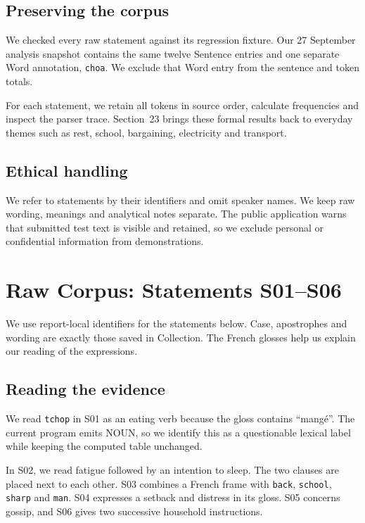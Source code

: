 \documentclass[11pt]{article}
\newcommand{\code}[1]{\texttt{#1}}
\begin{document}
\subsection*{Preserving the corpus}
We checked every raw statement against its regression fixture. Our
27 September analysis snapshot contains the same twelve Sentence entries
and one separate Word annotation, \code{choa}. We exclude that Word entry
from the sentence and token totals.

For each statement, we retain all tokens in source order, calculate
frequencies and inspect the parser trace. Section~23 brings these formal
results back to everyday themes such as rest, school, bargaining,
electricity and transport.

\subsection*{Ethical handling}
We refer to statements by their identifiers and omit speaker names.
We keep raw wording, meanings and analytical notes separate. The public
application warns that submitted test text is visible and retained, so we
exclude personal or confidential information from demonstrations.

\clearpage
\section{Raw Corpus: Statements S01--S06}
We use report-local identifiers for the statements below. Case, apostrophes
and wording are exactly those saved in Collection. The French glosses help
us explain our reading of the expressions.

{\small\renewcommand{\arraystretch}{1.6}}

\subsection*{Reading the evidence}
We read \code{tchop} in S01 as an eating verb because the gloss contains
``mang\'e''. The current program emits NOUN, so we identify this as a
questionable lexical label while keeping the computed table unchanged.

In S02, we read fatigue followed by an intention to sleep. The two clauses
are placed next to each other. S03 combines a French frame with
\code{back}, \code{school}, \code{sharp} and \code{man}. S04 expresses a
setback and distress in its gloss. S05 concerns gossip, and S06 gives two
successive household instructions.
\end{document}
